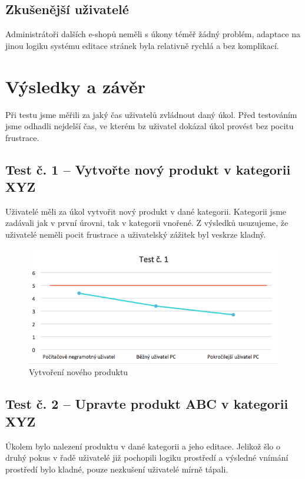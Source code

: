 \documentclass[11pt,a4paper]{article}
\begin{document}
\subsection*{Zkušenější uživatelé}
Administrátoři dalších e-shopů neměli s úkony téměř žádný problém, adaptace na jinou logiku systému editace stránek byla relativně rychlá a bez komplikací.

\section*{Výsledky a závěr}
Při testu jsme měřili za jaký čas uživatelů zvládnout daný úkol. Před testováním jsme odhadli nejdelší čas, ve kterém bz uživatel dokázal úkol provést bez pocitu frustrace.

\subsection*{Test č. 1 -- Vytvořte nový produkt v kategorii XYZ}
Uživatelé měli za úkol vytvořit nový produkt v dané kategorii. Kategorii jsme zadávali jak v první úrovni, tak v kategorii vnořené. Z výsledků usuzujeme, že uživatelé neměli pocit frustrace a uživatelský zážitek byl veskrze kladný.

\begin{figure}[ht]
    \centering
    \includegraphics[width=\textwidth]{t1.png}
    \caption{Vytvoření nového produktu}
\end{figure}

\subsection*{Test č. 2 -- Upravte produkt ABC v kategorii XYZ}
Úkolem bylo nalezení produktu v dané kategorii a jeho editace. Jelikož šlo o druhý pokus v řadě uživatelé již pochopili logiku prostředí a výsledné vnímání prostředí bylo kladné, pouze nezkušení uživatelé mírně tápali.
\end{document}
